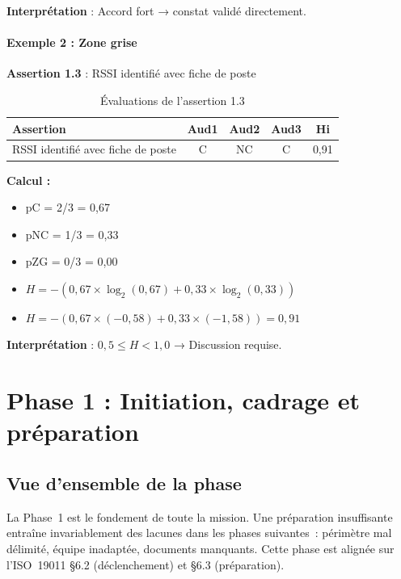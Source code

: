 \documentclass[12pt,a4paper,oneside]{report}
\begin{document}
\textbf{Interprétation} : Accord fort → constat validé directement.

\paragraph{Exemple 2 : Zone grise}

\textbf{Assertion 1.3} : RSSI identifié avec fiche de poste

\begin{table}[H]
	\centering\small
	\caption{Évaluations de l'assertion 1.3}
	\label{tab:entropie_exemple2}
	\begin{tabular}{|p{3.5cm}|c|c|c|c|}
		\hline
		\textbf{Assertion} & \textbf{Aud1} & \textbf{Aud2} & \textbf{Aud3} & \textbf{Hi} \\
		\hline
		RSSI identifié avec fiche de poste & C & NC & C & 0,91 \\
		\hline
	\end{tabular}
\end{table}
\textbf{Calcul :}
\begin{itemize}[label={\color{gold}}, leftmargin=*]
	\item pC = 2/3 = 0,67
	\item pNC = 1/3 = 0,33
	\item pZG = 0/3 = 0,00
	\item $H = -(0{,}67 \times \log_{2}(0{,}67) + 0{,}33 \times \log_{2}(0{,}33))$
	\item $H = -(0{,}67 \times (-0{,}58) + 0{,}33 \times (-1{,}58)) = 0{,}91$
\end{itemize}

\textbf{Interprétation} : $0{,}5 \leq H < 1{,}0$ → Discussion requise. 
\section{Phase 1 : Initiation, cadrage et pr\'eparation}
\label{sec:phase1}

\subsection{Vue d'ensemble de la phase}

La Phase~1 est le fondement de toute la mission. Une pr\'eparation insuffisante
entra\^ine invariablement des lacunes dans les phases suivantes~: p\'erim\`etre
mal d\'elimit\'e, \'equipe inadapt\'ee, documents manquants. Cette phase est
align\'ee sur l'ISO~19011 §6.2 (d\'eclenchement) et §6.3 (pr\'eparation).
\end{document}
